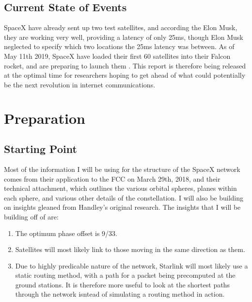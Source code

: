 \documentclass[12pt,a4paper,twoside,openright]{report}
\begin{document}
\section{Current State of Events}
SpaceX have already sent up two test satellites, and according the Elon Musk, they are working very well, providing a latency of only 25ms\cite{ElonMuskTweet}, though Elon Musk neglected to specify which two locations the 25ms latency was between. As of May 11th 2019, SpaceX have loaded their first 60 satellites into their Falcon rocket, and are preparing to launch them \cite{ElonMuskTweet2}. This report is therefore being released at the optimal time for researchers hoping to get ahead of what could potentially be the next revolution in internet communications.

\chapter{Preparation}

\section{Starting Point}

Most of the information I will be using for the structure of the SpaceX network comes from their application to the FCC on March 29th, 2018\cite{FCCApplication}, and their technical attachment\cite{TechnicalAttachment}, which outlines the various orbital spheres, planes within each sphere, and various other details of the constellation. I will also be building on insights gleaned from Handley's original research. The insights that I will be building off of are:

\begin{enumerate}
\item The optimum phase offset is 9/33.
\item Satellites will most likely link to those moving in the same direction as them.
\item Due to highly predicable nature of the network, Starlink will most likely use a static routing method, with a path for a packet being precomputed at the ground stations. It is therefore more useful to look at the shortest paths through the network isntead of simulating a routing method in action.
\end{enumerate}
\end{document}
